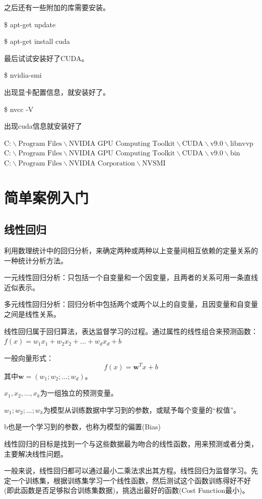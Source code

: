 \documentclass[openbib]{article}
\begin{document}
	之后还有一些附加的库需要安装。
	
	\$ apt-get update
	
	\$ apt-get install cuda
	
	最后试试安装好了CUDA。
	
	\$ nvidia-smi
	
	出现显卡配置信息，就安装好了。
	
	\$ nvcc -V
	
	出现cuda信息就安装好了
	
$	\text{C:$\backslash$Program Files$\backslash$NVIDIA GPU Computing Toolkit$\backslash$CUDA$\backslash$v9.0$\backslash$libnvvp}$
$ 	\text{C:$\backslash$Program Files$\backslash$NVIDIA GPU Computing Toolkit$\backslash$CUDA$\backslash$v9.0$\backslash$bin}$
$	\text{C:$\backslash$Program Files$\backslash$NVIDIA Corporation$\backslash$NVSMI}$
	


\section{简单案例入门}
\subsection{线性回归}
利用数理统计中的回归分析，来确定两种或两种以上变量间相互依赖的定量关系的一种统计分析方法。

一元线性回归分析：只包括一个自变量和一个因变量，且两者的关系可用一条直线近似表示。

多元线性回归分析：回归分析中包括两个或两个以上的自变量，且因变量和自变量之间是线性关系。

线性回归属于回归算法，表达监督学习的过程。通过属性的线性组合来预测函数：$f(x) = w_{1}x_{1}+w_{2}x_{2}+...+w_{d}x_{d}+b$

一般向量形式：
$$f(x) = \textbf{w}^{T}x+b$$
其中$\textbf{w}=(w_{1};w_{2};...;w_{d})$。

$x_{1},x_{2},...,x_{k}$为一组独立的预测变量。

$w_{1};w_{2};...;w_{k}$为模型从训练数据中学习到的参数，或赋予每个变量的“权值”。

b也是一个学习到的参数，也称为模型的偏置(Bias)

线性回归的目标是找到一个与这些数据最为吻合的线性函数，用来预测或者分类，主要解决线性问题。

一般来说，线性回归都可以通过最小二乘法求出其方程。线性回归为监督学习。先定一个训练集，根据训练集学习一个线性函数，然后测试这个函数训练得好不好(即此函数是否足够拟合训练集数据)，挑选出最好的函数(Cost Function最小)。
\end{document}
